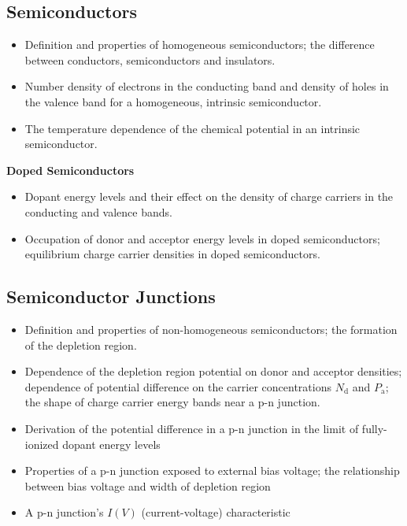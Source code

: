 \subsection{Semiconductors}
\begin{itemize}

    \item Definition and properties of homogeneous semiconductors;
    the difference between conductors, semiconductors and insulators.

    \item Number density of electrons in the conducting band and density of holes in the valence band for a homogeneous, intrinsic semiconductor.

    \item The temperature dependence of the chemical potential in an intrinsic semiconductor.

\end{itemize}

\textbf{Doped Semiconductors}
\begin{itemize}

    \item Dopant energy levels and their effect on the density of charge carriers in the conducting and valence bands.

    \item Occupation of donor and acceptor energy levels in doped semiconductors;
    equilibrium charge carrier densities in doped semiconductors.

\end{itemize}

\subsection{Semiconductor Junctions}
\begin{itemize}

    \item Definition and properties of non-homogeneous semiconductors;
    the formation of the depletion region.

    \item Dependence of the depletion region potential on donor and acceptor densities;
    dependence of potential difference on the carrier concentrations $N_{\text{d}}$ and $P_{\text{a}}$;
    the shape of charge carrier energy bands near a p-n junction.

    \item Derivation of the potential difference in a p-n junction in the limit of fully-ionized dopant energy levels

    \item Properties of a p-n junction exposed to external bias voltage;
    the relationship between bias voltage and width of depletion region

    \item A p-n junction's $I(V)$ (current-voltage) characteristic

\end{itemize}

